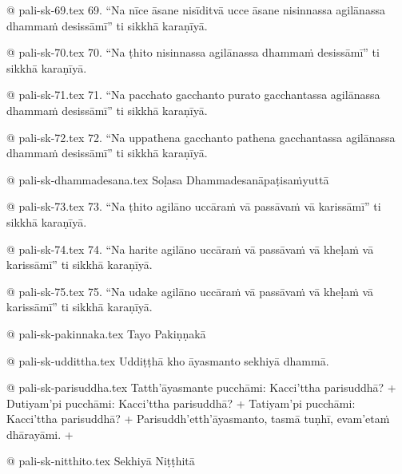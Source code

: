 @ pali-sk-69.tex
69. “Na nīce āsane nisīditvā ucce āsane nisinnassa agilānassa dhammaṁ desissāmī” ti sikkhā karaṇīyā.

@ pali-sk-70.tex
70. “Na ṭhito nisinnassa agilānassa dhammaṁ desissāmī” ti sikkhā karaṇīyā.

@ pali-sk-71.tex
71. “Na pacchato gacchanto purato gacchantassa agilānassa dhammaṁ desissāmī” ti sikkhā karaṇīyā.

@ pali-sk-72.tex
72. “Na uppathena gacchanto pathena gacchantassa agilānassa dhammaṁ desissāmī” ti sikkhā karaṇīyā.

@ pali-sk-dhammadesana.tex
Soḷasa Dhammadesanāpaṭisaṁyuttā

@ pali-sk-73.tex
73. “Na ṭhito agilāno uccāraṁ vā passāvaṁ vā karissāmī” ti sikkhā karaṇīyā.

@ pali-sk-74.tex
74. “Na harite agilāno uccāraṁ vā passāvaṁ vā kheḷaṁ vā karissāmī” ti sikkhā karaṇīyā.

@ pali-sk-75.tex
75. “Na udake agilāno uccāraṁ vā passāvaṁ vā kheḷaṁ vā karissāmī” ti sikkhā karaṇīyā.

@ pali-sk-pakinnaka.tex
Tayo Pakiṇṇakā

@ pali-sk-uddittha.tex
Uddiṭṭhā kho āyasmanto sekhiyā dhammā.

@ pali-sk-parisuddha.tex
Tatth’āyasmante pucchāmi: Kacci’ttha parisuddhā? +
Dutiyam’pi pucchāmi: Kacci’ttha parisuddhā? +
Tatiyam’pi pucchāmi: Kacci’ttha parisuddhā? +
Parisuddh’etth’āyasmanto, tasmā tuṇhī, evam’etaṁ dhārayāmi. +

@ pali-sk-nitthito.tex
Sekhiyā Niṭṭhitā

